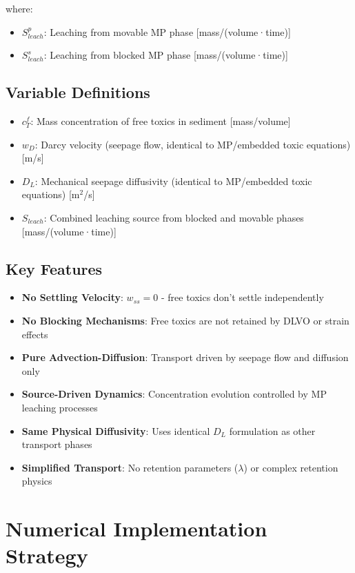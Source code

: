 \documentclass[11pt,a4paper]{article}
\begin{document}
where:
\begin{itemize}
    \item $S_{leach}^p$: Leaching from movable MP phase [mass/(volume·time)]
    \item $S_{leach}^s$: Leaching from blocked MP phase [mass/(volume·time)]
\end{itemize}

\subsection{Variable Definitions}

\begin{itemize}
    \item $c_T^f$: Mass concentration of free toxics in sediment [mass/volume]
    \item $w_D$: Darcy velocity (seepage flow, identical to MP/embedded toxic equations) [m/s]
    \item $D_L$: Mechanical seepage diffusivity (identical to MP/embedded toxic equations) [m$^2$/s]
    \item $S_{leach}$: Combined leaching source from blocked and movable phases [mass/(volume·time)]
\end{itemize}

\subsection{Key Features}

\begin{itemize}
    \item \textbf{No Settling Velocity}: $w_{ss} = 0$ - free toxics don't settle independently
    \item \textbf{No Blocking Mechanisms}: Free toxics are not retained by DLVO or strain effects
    \item \textbf{Pure Advection-Diffusion}: Transport driven by seepage flow and diffusion only
    \item \textbf{Source-Driven Dynamics}: Concentration evolution controlled by MP leaching processes
    \item \textbf{Same Physical Diffusivity}: Uses identical $D_L$ formulation as other transport phases
    \item \textbf{Simplified Transport}: No retention parameters ($\lambda$) or complex retention physics
\end{itemize}

\section{Numerical Implementation Strategy}
\end{document}
